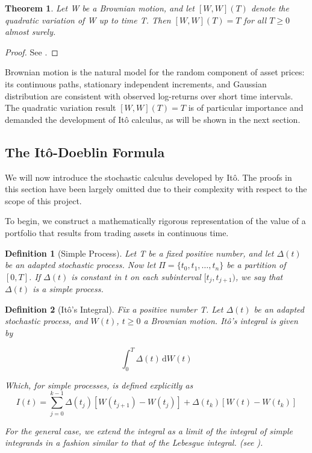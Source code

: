 \documentclass[11pt, a4paper]{article}
\newtheorem{theorem}{Theorem}
\newtheorem{definition}{Definition}
\numberwithin{equation}{subsection}
\numberwithin{definition}{subsection}
\numberwithin{theorem}{subsection}
\numberwithin{remark}{subsection}
\begin{document}
\begin{theorem}
Let W be a Brownian motion, and let \([W, W](T)\) denote the quadratic variation of W up to time T. Then \([W, W](T) = T\) for all \(T \geq 0\) almost surely.
\end{theorem}

\begin{proof}
See \cite[p.~102]{shreve2004}.
\end{proof}

Brownian motion is the natural model for the random component of asset prices: its continuous paths, stationary independent increments, and Gaussian distribution are consistent with observed log-returns over short time intervals. The quadratic variation result \([W,W](T) = T\) is of particular importance and demanded the development of It\^{o} calculus, as will be shown in the next section.

\subsection{The It\^{o}-Doeblin Formula}

We will now introduce the stochastic calculus developed by It\^{o}. The proofs in this section have been largely omitted due to their complexity with respect to the scope of this project.

To begin, we construct a mathematically rigorous representation of the value of a portfolio that results from trading assets in continuous time. 

\begin{definition}[Simple Process]
    Let T be a fixed positive number, and let \(\Delta(t)\) be an adapted stochastic process. Now let \(\Pi = \{t_0,t_1,\ldots,t_n\}\) be a partition of \([0, T]\). If \(\Delta(t)\) is constant in t on each subinterval \([t_j,t_{j+1})\), we say that \(\Delta(t)\) is a \textup{simple process}.
\end{definition}

\begin{definition}[It\^{o}'s Integral]
    Fix a positive number T. Let \(\Delta(t)\) be an adapted stochastic process, and \(W(t)\), \(t \geq 0\) a Brownian motion. \textup{It\^{o}'s integral} is given by

    \begin{equation}
        \int_{0}^{T} \Delta(t) \, \mathrm{d} W(t)
        \label{ito}
    \end{equation}

Which, for simple processes, is defined explicitly as
\begin{equation}
    I(t) = \sum_{j=0}^{k-1} \Delta(t_j)[W(t_{j+1}) - W(t_j)] + \Delta(t_k)[W(t) - W(t_k)]
\end{equation}

For the general case, we extend the integral as a limit of the integral of simple integrands in a fashion similar to that of the Lebesgue integral. (see \cite[p.~126]{shreve2004}).

\end{definition}
\end{document}
